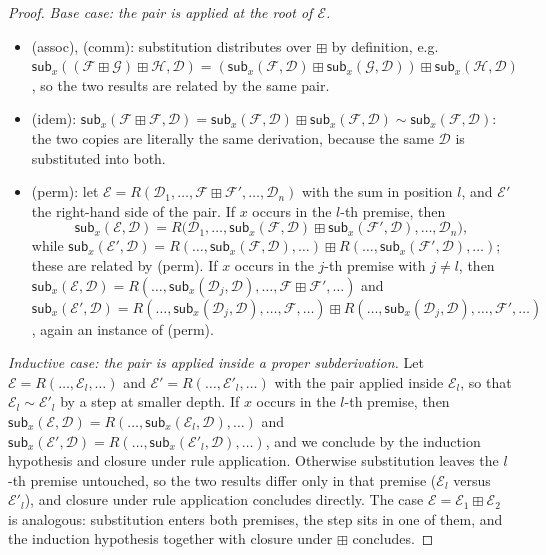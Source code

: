 \begin{proof}
\emph{Base case: the pair is applied at the root of $\mathcal{E}$.}
\begin{itemize}
  \item (assoc), (comm): substitution distributes over $\boxplus$ by definition, e.g.\ $\mathsf{sub}_x((\mathcal{F} \boxplus \mathcal{G}) \boxplus \mathcal{H}, \mathcal{D}) = (\mathsf{sub}_x(\mathcal{F},\mathcal{D}) \boxplus \mathsf{sub}_x(\mathcal{G},\mathcal{D})) \boxplus \mathsf{sub}_x(\mathcal{H},\mathcal{D})$, so the two results are related by the same pair.
  \item (idem): $\mathsf{sub}_x(\mathcal{F} \boxplus \mathcal{F}, \mathcal{D}) = \mathsf{sub}_x(\mathcal{F}, \mathcal{D}) \boxplus \mathsf{sub}_x(\mathcal{F}, \mathcal{D}) \sim \mathsf{sub}_x(\mathcal{F}, \mathcal{D})$: the two copies are literally the same derivation, because the same $\mathcal{D}$ is substituted into both.
  \item (perm): let $\mathcal{E} = R(\mathcal{D}_1, \ldots, \mathcal{F} \boxplus \mathcal{F}', \ldots, \mathcal{D}_n)$ with the sum in position $l$, and $\mathcal{E}'$ the right-hand side of the pair.
  If $x$ occurs in the $l$-th premise, then
  \[
  \mathsf{sub}_x(\mathcal{E}, \mathcal{D}) = R\bigl(\mathcal{D}_1, \ldots, \mathsf{sub}_x(\mathcal{F},\mathcal{D}) \boxplus \mathsf{sub}_x(\mathcal{F}',\mathcal{D}), \ldots, \mathcal{D}_n\bigr),
  \]
  while $\mathsf{sub}_x(\mathcal{E}', \mathcal{D}) = R(\ldots, \mathsf{sub}_x(\mathcal{F},\mathcal{D}), \ldots) \boxplus R(\ldots, \mathsf{sub}_x(\mathcal{F}',\mathcal{D}), \ldots)$; these are related by (perm).
  If $x$ occurs in the $j$-th premise with $j \neq l$, then
  $\mathsf{sub}_x(\mathcal{E},\mathcal{D}) = R(\ldots, \mathsf{sub}_x(\mathcal{D}_j, \mathcal{D}), \ldots, \mathcal{F} \boxplus \mathcal{F}', \ldots)$
  and
  $\mathsf{sub}_x(\mathcal{E}',\mathcal{D}) = R(\ldots, \mathsf{sub}_x(\mathcal{D}_j, \mathcal{D}), \ldots, \mathcal{F}, \ldots) \boxplus R(\ldots, \mathsf{sub}_x(\mathcal{D}_j, \mathcal{D}), \ldots, \mathcal{F}', \ldots)$,
  again an instance of (perm).
\end{itemize}

\emph{Inductive case: the pair is applied inside a proper subderivation.}
Let $\mathcal{E} = R(\ldots, \mathcal{E}_l, \ldots)$ and $\mathcal{E}' = R(\ldots, \mathcal{E}'_l, \ldots)$ with the pair applied inside $\mathcal{E}_l$, so that $\mathcal{E}_l \sim \mathcal{E}'_l$ by a step at smaller depth.
If $x$ occurs in the $l$-th premise, then $\mathsf{sub}_x(\mathcal{E},\mathcal{D}) = R(\ldots, \mathsf{sub}_x(\mathcal{E}_l, \mathcal{D}), \ldots)$ and $\mathsf{sub}_x(\mathcal{E}',\mathcal{D}) = R(\ldots, \mathsf{sub}_x(\mathcal{E}'_l, \mathcal{D}), \ldots)$, and we conclude by the induction hypothesis and closure under rule application.
Otherwise substitution leaves the $l$-th premise untouched, so the two results differ only in that premise ($\mathcal{E}_l$ versus $\mathcal{E}'_l$), and closure under rule application concludes directly.
The case $\mathcal{E} = \mathcal{E}_1 \boxplus \mathcal{E}_2$ is analogous: substitution enters both premises, the step sits in one of them, and the induction hypothesis together with closure under $\boxplus$ concludes.
\end{proof}

